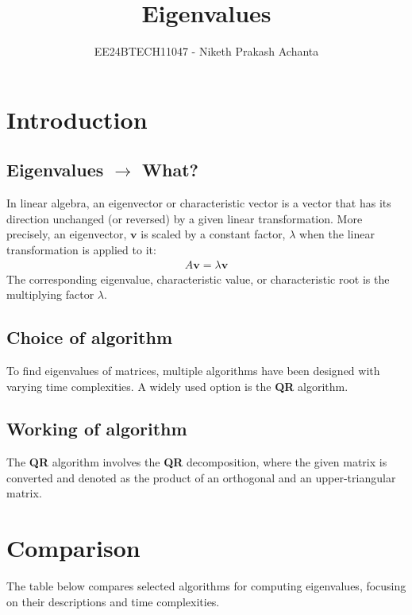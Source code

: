 \documentclass[journal]{IEEEtran}
\begin{document}

\vspace{3cm}

\title{Eigenvalues}
\author{EE24BTECH11047 - Niketh Prakash Achanta
}
{\let\newpage\relax\maketitle}
\renewcommand{\thefigure}{\theenumi}
\renewcommand{\thetable}{\theenumi}
\setlength{\intextsep}{10pt} %
\section{Introduction}
\subsection{Eigenvalues $\rightarrow$ What?}
In linear algebra, an eigenvector or characteristic vector is a vector that has its direction unchanged (or reversed) by a given linear transformation. More precisely, an eigenvector, $\mathbf{v}$ is scaled by a constant factor, $\lambda$ when the linear transformation is applied to it: 
\begin{align*}
    A\mathbf{v}=\lambda\mathbf{v}
\end{align*}
The corresponding eigenvalue, characteristic value, or characteristic root is the multiplying factor $\lambda$.
\subsection{Choice of algorithm}
To find eigenvalues of matrices, multiple algorithms have been designed with varying time complexities. A widely used option is the \textbf{QR} algorithm.
\subsection{Working of algorithm}
The \textbf{QR} algorithm involves the \textbf{QR} decomposition, where the given matrix is converted and denoted as the product of an orthogonal  and an upper-triangular  matrix.\\
\section{Comparison}
The table below compares selected algorithms for computing eigenvalues, focusing on their descriptions and time complexities.
\end{document}

